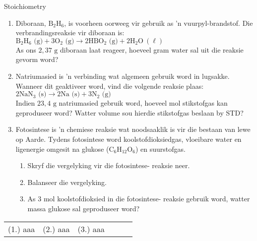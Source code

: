 \begin{exercises}{Stoichiometry}
            \nopagebreak \noindent
      \label{m38712*id285393}\begin{enumerate}[noitemsep, label=\textbf{\arabic*}. ] 
            \label{m38712*uid101}\item Diboraan, $\text{B}{}_{2}\text{H}{}_{6}$, is voorheen oorweeg vir gebruik as 'n vuurpyl-brandstof. Die verbrandingsreaksie vir diboraan is:\\
${\text{B}}_{2}{\text{H}}_{6} \text{ (g)} + 3{\text{O}}_{2} \text{ (g)} \to 2\text{H}\text{B}{\text{O}}_{2} \text{ (g)} + 2{\text{H}}_{2}\text{O} ~\left( \ell \right)$\\
As ons $2,37 \text{ g}$ diboraan laat reageer, hoeveel gram water sal uit die reaksie gevorm word?
\item Natriumasied is 'n verbinding wat algemeen gebruik word in lugsakke. Wanneer dit geaktiveer word, vind die volgende reaksie plaas: \\
$2{\text{NaN}}_{3} \text{ (s)} \to 2\text{Na} \text{ (s)} + 3{\text{N}}_{2} \text{ (g)}$\\
Indien $23,4 \text{ g}$ natriumasied gebruik word, hoeveel mol stikstofgas kan geproduseer word? Watter volume sou hierdie stikstofgas beslaan by STD?
\label{m38712*uid103}\item Fotosintese is 'n chemiese reaksie wat noodsaaklik is vir die bestaan ​​van lewe op
         Aarde. Tydens fotosintese word koolstofdioksiedgas, vloeibare water en ligenergie omgesit na glukose ($\text{C}{}_{6}\text{H}{}_{12}\text{O}{}_{6}$) en suurstofgas.
\label{m38712*id285674}\begin{enumerate}[noitemsep, label=\textbf{\alph*}. ] 
            \label{m38712*uid104}\item Skryf die vergelyking vir die fotosintese- reaksie neer.
\label{m38712*uid105}\item Balanseer die vergelyking.
\label{m38712*uid106}\item As $3 \text{ mol}$ koolstofdioksied in die fotosintese- reaksie gebruik word, watter massa glukose sal geproduseer word?
\end{enumerate}
                \end{enumerate}
\practiceinfo
\par 
 \par \begin{tabular}[h]{cccccc}
 (1.) aaa  &  (2.) aaa  &  (3.) aaa  & \end{tabular}
\end{exercises}

